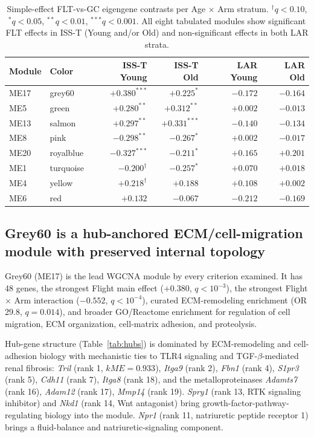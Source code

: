 \documentclass[11pt]{article}
\newcommand{\gene}[1]{\textit{#1}}
\begin{document}
\begin{table}[h]
\centering\small
\begin{tabular}{llrrrr}
\toprule
Module & Color & ISS-T Young & ISS-T Old & LAR Young & LAR Old \\
\midrule
ME17 & grey60 & $+0.380^{***}$ & $+0.225^{*}$ & $-0.172$ & $-0.164$ \\
ME5 & green & $+0.280^{**}$ & $+0.312^{**}$ & $+0.002$ & $-0.013$ \\
ME13 & salmon & $+0.297^{**}$ & $+0.331^{***}$ & $-0.140$ & $-0.134$ \\
ME8 & pink & $-0.298^{**}$ & $-0.267^{*}$ & $+0.002$ & $-0.017$ \\
ME20 & royalblue & $-0.327^{***}$ & $-0.211^{*}$ & $+0.165$ & $+0.201$ \\
ME1 & turquoise & $-0.200^{\dagger}$ & $-0.257^{*}$ & $+0.070$ & $+0.018$ \\
ME4 & yellow & $+0.218^{\dagger}$ & $+0.188$ & $+0.108$ & $+0.002$ \\
ME6 & red & $+0.132$ & $-0.067$ & $-0.212$ & $-0.169$ \\
\bottomrule
\end{tabular}
\caption{Simple-effect FLT-vs-GC eigengene contrasts per Age $\times$ Arm stratum. $^{\dagger}q<0.10$, $^{*}q<0.05$, $^{**}q<0.01$, $^{***}q<0.001$. All eight tabulated modules show significant FLT effects in ISS-T (Young and/or Old) and non-significant effects in both LAR strata.}
\label{tab:simple_effects}
\end{table}

\subsection{Grey60 is a hub-anchored ECM/cell-migration module with preserved internal topology}

Grey60 (ME17) is the lead WGCNA module by every criterion examined. It has 48 genes, the strongest Flight main effect ($+0.380$, $q < 10^{-3}$), the strongest Flight $\times$ Arm interaction ($-0.552$, $q < 10^{-4}$), curated ECM-remodeling enrichment (OR 29.8, $q = 0.014$), and broader GO/Reactome enrichment for regulation of cell migration, ECM organization, cell-matrix adhesion, and proteolysis.

Hub-gene structure (Table~\ref{tab:hubs}) is dominated by ECM-remodeling and cell-adhesion biology with mechanistic ties to TLR4 signaling and TGF-$\beta$-mediated renal fibrosis: \gene{Tril} (rank 1, $kME = 0.933$), \gene{Itga9} (rank 2), \gene{Fbn1} (rank 4), \gene{S1pr3} (rank 5), \gene{Cdh11} (rank 7), \gene{Itga8} (rank 18), and the metalloproteinases \gene{Adamts7} (rank 16), \gene{Adam12} (rank 17), \gene{Mmp14} (rank 19). \gene{Spry1} (rank 13, RTK signaling inhibitor) and \gene{Nkd1} (rank 14, Wnt antagonist) bring growth-factor-pathway-regulating biology into the module. \gene{Npr1} (rank 11, natriuretic peptide receptor 1) brings a fluid-balance and natriuretic-signaling component.
\end{document}
